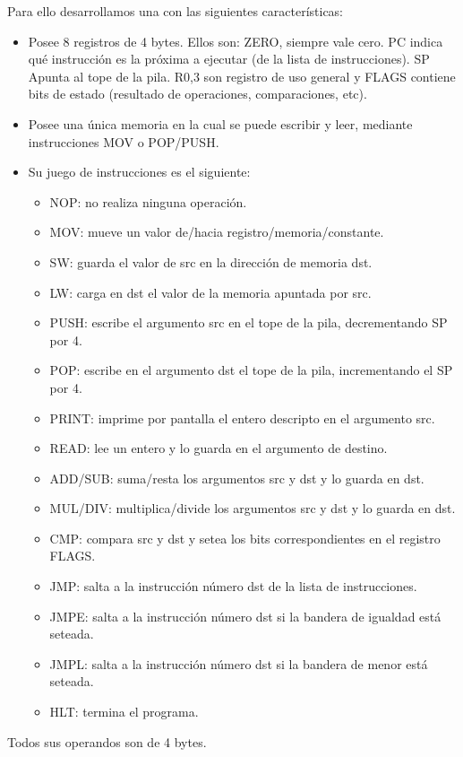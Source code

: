 \documentclass[a4paper,12pt]{article}
\begin{document}
	Para ello desarrollamos una con las siguientes características:
\begin{itemize}
\item Posee 8 registros de 4 bytes. Ellos son: ZERO, siempre vale cero. PC indica qu\'e instrucci\'on es la pr\'oxima a ejecutar (de la lista de instrucciones). SP Apunta al tope de la pila. R0,3 son registro de uso general y FLAGS contiene bits de estado (resultado de operaciones, comparaciones, etc).
\item Posee una \'unica memoria en la cual se puede escribir y leer, mediante instrucciones MOV o POP/PUSH.
\item Su juego de instrucciones es el siguiente:
\begin{itemize}
\item NOP: no realiza ninguna operaci\'on.
\item MOV: mueve un valor de/hacia registro/memoria/constante.
\item SW: guarda el valor de src en la direcci\'on de memoria dst.
\item LW: carga en dst el valor de la memoria apuntada por src.
\item PUSH: escribe el argumento src en el tope de la pila, decrementando SP por 4.
\item POP: escribe en el argumento dst el tope de la pila, incrementando el SP por 4.
\item PRINT: imprime por pantalla el entero descripto en el argumento src.
\item READ: lee un entero y lo guarda en el argumento de destino.
\item ADD/SUB: suma/resta los argumentos src y dst y lo guarda en dst.
\item MUL/DIV: multiplica/divide los argumentos src y dst y lo guarda en dst.
\item CMP: compara src y dst y setea los bits correspondientes en el registro FLAGS.
\item JMP: salta a la instrucci\'on n\'umero dst de la lista de instrucciones.
\item JMPE: salta a la instrucci\'on n\'umero dst si la bandera de igualdad est\'a seteada.
\item JMPL: salta a la instrucci\'on n\'umero dst si la bandera de menor est\'a seteada.
\item HLT: termina el programa.
\end{itemize}
\end{itemize}

Todos sus operandos son de 4 bytes.
	
\end{document}
